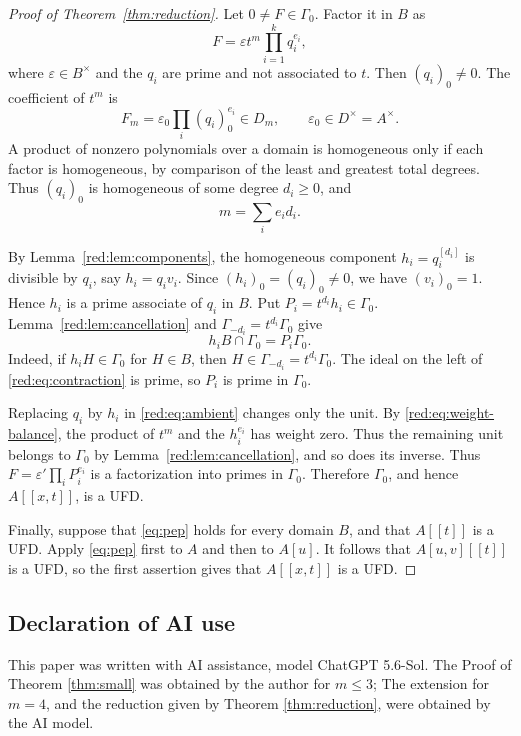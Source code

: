 \documentclass[11pt]{amsart}
\theoremstyle{remark}
\begin{document}
\begin{proof}[Proof of Theorem~\ref{thm:reduction}]
Let $0\ne F\in\Gamma_0$. Factor it in $B$ as
\begin{equation}\label{red:eq:ambient}
 F=\varepsilon t^m\prod_{i=1}^k q_i^{e_i},
\end{equation}
where $\varepsilon\in B^\times$ and the $q_i$ are prime and
not associated to $t$. Then $(q_i)_0\ne0$. The coefficient of
$t^m$ is
\[
 F_m=\varepsilon_0\prod_i(q_i)_0^{e_i}\in D_m,
 \qquad\varepsilon_0\in D^\times=A^\times.
\]
A product of nonzero polynomials over a domain is homogeneous
only if each factor is homogeneous, by comparison of the least
and greatest total degrees. Thus $(q_i)_0$ is homogeneous of
some degree $d_i\geq0$, and
\begin{equation}\label{red:eq:weight-balance}
 m=\sum_i e_id_i.
\end{equation}

By Lemma~\ref{red:lem:components}, the homogeneous component
$h_i=q_i^{[d_i]}$ is divisible by $q_i$, say $h_i=q_iv_i$.
Since $(h_i)_0=(q_i)_0\ne0$, we have $(v_i)_0=1$. Hence
$h_i$ is a prime associate of $q_i$ in $B$.
Put $P_i=t^{d_i}h_i\in\Gamma_0$. Lemma~\ref{red:lem:cancellation}
and $\Gamma_{-d_i}=t^{d_i}\Gamma_0$ give
\begin{equation}\label{red:eq:contraction}
 h_iB\cap\Gamma_0=P_i\Gamma_0.
\end{equation}
Indeed, if $h_iH\in\Gamma_0$ for $H\in B$, then
$H\in\Gamma_{-d_i}=t^{d_i}\Gamma_0$. The ideal on the left
of \eqref{red:eq:contraction} is prime, so $P_i$ is prime
in $\Gamma_0$.

Replacing $q_i$ by $h_i$ in \eqref{red:eq:ambient} changes
only the unit. By \eqref{red:eq:weight-balance}, the product
of $t^m$ and the $h_i^{e_i}$ has weight zero. Thus the remaining
unit belongs to $\Gamma_0$ by Lemma~\ref{red:lem:cancellation},
and so does its inverse. Thus $F=\varepsilon'\prod_i P_i^{e_i}$
is a factorization into primes in $\Gamma_0$. Therefore $\Gamma_0$, and hence
$A[[x,t]]$, is a UFD.

Finally, suppose that \eqref{eq:pep} holds for every domain $B$,
and that $A[[t]]$ is a UFD. Apply \eqref{eq:pep} first to $A$
and then to $A[u]$. It follows that $A[u,v][[t]]$ is a UFD,
so the first assertion gives that $A[[x,t]]$ is a UFD.
\end{proof}

\subsection*{Declaration of AI use}
This paper was written with AI assistance, model ChatGPT 5.6-Sol. The Proof of Theorem \ref{thm:small} was obtained by the author for $m \leq 3$; The extension for $m = 4$, and the reduction given by Theorem \ref{thm:reduction}, were obtained by the AI model.
\end{document}
